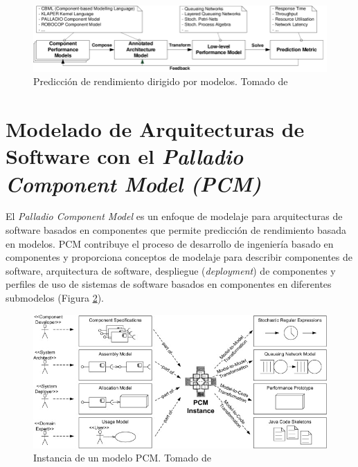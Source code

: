 \documentclass[11pt, twoside]{report}
\begin{document}
\begin{figure}[h]
  \centering
  \includegraphics[width=15cm]{model-driven-performance-prediction}
  \caption{\small{Predicción de rendimiento dirigido por modelos. Tomado de \cite{happe-et-al}}}
  \label{fig:model-driven-performance-prediction}
\end{figure}

\section{Modelado de Arquitecturas de Software con el \emph{Palladio Component Model (PCM)}}
El \emph{Palladio Component Model} es un enfoque de modelaje para arquitecturas de software basados en componentes que permite predicción de rendimiento basada en modelos. PCM contribuye el proceso de desarrollo de ingeniería basado en componentes y proporciona conceptos de modelaje para describir componentes de software, arquitectura de software, despliegue (\emph{deployment}) de componentes y perfiles de uso de sistemas de software basados en componentes en diferentes submodelos (Figura \ref{fig:pcm-instance}). 

\begin{figure}[h]
  \centering
  \includegraphics[width=15cm]{palladio-cbse-process}
  \caption{\small{Instancia de un modelo PCM. Tomado de \cite{happe-et-al}}}
  \label{fig:pcm-instance}
\end{figure}
\end{document}
